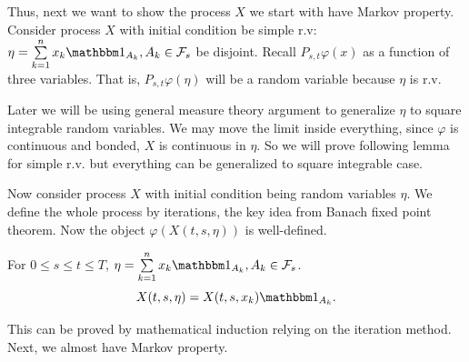 Thus, next we want to show the process $X$ we start with have Markov property.\\
Consider process $X$ with initial condition be simple r.v: $\eta = \bigs{ k=1}^n x_k \I{A_k}, A_k \in \F_s$ be disjoint. Recall $P_{s,t}\varphi(x)$ as a function of three variables. That is, $P_{s,t}\varphi(\eta)$ will be a random variable because $\eta$ is r.v.
\begin{rem}
Later we will be using general measure theory argument to generalize $\eta$ to square integrable random variables. We may move the limit inside everything, since $\varphi$ is continuous and bonded, $X$ is continuous in $\eta$. So we will prove following lemma for simple r.v. but everything can be generalized to square integrable case. 
\end{rem}
Now consider process $X$ with initial condition being random variables $\eta$. We define the whole process by iterations, the key idea from Banach fixed point theorem. Now the object $\varphi(X(t,s,\eta))$ is well-defined.
\begin{lem}
For $0 \leq s \leq t \leq T$, $\eta = \bigs{ k=1}^n x_k \I{A_k}, A_k \in \F_s$.
\begin{equation*}
    X(t,s,\eta) = X(t,s,x_k)\I{A_k}.
\end{equation*}
\end{lem}
\pf This can be proved by mathematical induction relying on the iteration method. Next, we almost have Markov property.

